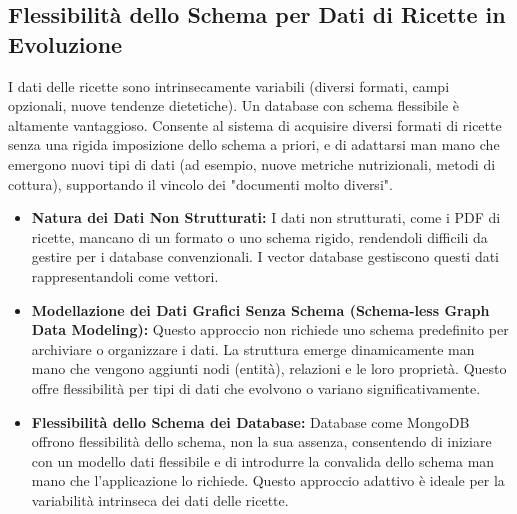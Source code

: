 \documentclass[a4paper, 11pt]{article}
\begin{document}
\subsection{Flessibilità dello Schema per Dati di Ricette in Evoluzione}
I dati delle ricette sono intrinsecamente variabili (diversi formati, campi opzionali, nuove tendenze dietetiche). Un database con schema flessibile è altamente vantaggioso. Consente al sistema di acquisire diversi formati di ricette senza una rigida imposizione dello schema a priori, e di adattarsi man mano che emergono nuovi tipi di dati (ad esempio, nuove metriche nutrizionali, metodi di cottura), supportando il vincolo dei "documenti molto diversi".
\begin{itemize}
    \item \textbf{Natura dei Dati Non Strutturati:} I dati non strutturati, come i PDF di ricette, mancano di un formato o uno schema rigido, rendendoli difficili da gestire per i database convenzionali. \cite{qdrant_vector_db} I vector database gestiscono questi dati rappresentandoli come vettori. \cite{qdrant_vector_db}
    \item \textbf{Modellazione dei Dati Grafici Senza Schema (Schema-less Graph Data Modeling):} Questo approccio non richiede uno schema predefinito per archiviare o organizzare i dati. La struttura emerge dinamicamente man mano che vengono aggiunti nodi (entità), relazioni e le loro proprietà. \cite{schemaless_graph_modeling} Questo offre flessibilità per tipi di dati che evolvono o variano significativamente.
    \item \textbf{Flessibilità dello Schema dei Database:} Database come MongoDB offrono flessibilità dello schema, non la sua assenza, consentendo di iniziare con un modello dati flessibile e di introdurre la convalida dello schema man mano che l'applicazione lo richiede. \cite{mongodb_flexible_schema} Questo approccio adattivo è ideale per la variabilità intrinseca dei dati delle ricette.
\end{itemize}
\end{document}
